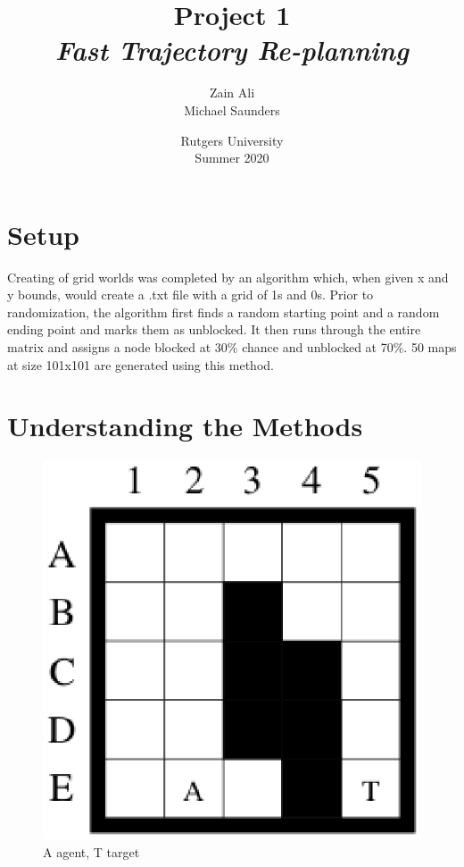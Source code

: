 \documentclass[titlepage]{article}
\title{\textbf{Project 1}\\\emph{Fast Trajectory Re-planning}}
\author{
    Zain Ali\\
    Michael Saunders\\
}
\date{Rutgers University\\Summer 2020}
\begin{document}
\maketitle

\section{Setup} Creating of grid worlds was completed by an algorithm which, when given x and y bounds, would create a .txt file with a grid of 1s and 0s. Prior to randomization, the algorithm first finds a random starting point and a random ending point and marks them as unblocked. It then runs through the entire matrix and assigns a node blocked at 30\% chance and unblocked at 70\%. 50 maps at size 101x101 are generated using this method.

\section{Understanding the Methods}
    
    \begin{figure}[h]
        \centering
        \includegraphics[scale = 0.5, trim = 0mm 10mm 0mm 0mm ]{figure8} %
        \caption{A \textleftarrow{} agent, T \textleftarrow{} target}
        \label{fig:2ndexample}
    \end{figure}
    
\end{document}
